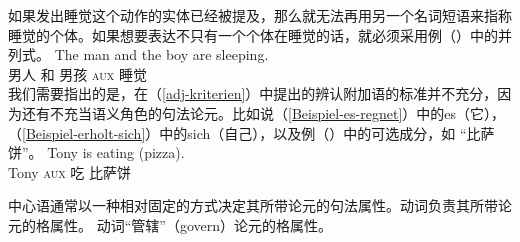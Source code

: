 如果发出睡觉这个动作的实体已经被提及，那么就无法再用另一个名词短语来指称睡觉的个体。如果想要表达不只有一个个体在睡觉的话，就必须采用例（）中的并列式。
\ea
\gll The man and the boy are sleeping.\\
       男人 和  男孩  \textsc{aux} 睡觉\\
\z
我们需要指出的是，在（\ref{adj-kriterien}）中提出的辨认附加语的标准并不充分，因为还有不充当语义角色的句法论元。比如说（\ref{Beispiel-es-regnet}）中的es（它），（\ref{Beispiel-erholt-sich}）中的sich（自己），以及例（）中的可选成分，如 “比萨饼”。
\ea
\gll Tony is           eating (pizza). \\
     Tony \textsc{aux} 吃     比萨饼\\
\z

\noindent
中心语通常以一种相对固定的方式决定其所带论元的句法属性。动词负责其所带论元的格属性。
\eal
{}
\zl
动词“管辖”（govern）论元的格属性。

